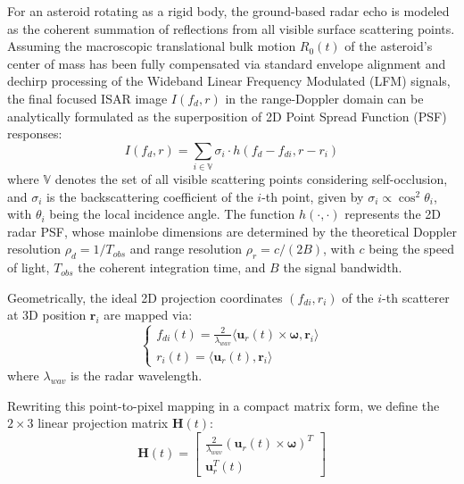 \documentclass[conference]{IEEEtran}
\begin{document}
For an asteroid rotating as a rigid body, the ground-based radar echo is modeled as the coherent summation of reflections from all visible surface scattering points. Assuming the macroscopic translational bulk motion $R_0(t)$ of the asteroid's center of mass has been fully compensated via standard envelope alignment and dechirp processing of the Wideband Linear Frequency Modulated (LFM) signals, the final focused ISAR image $I(f_d, r)$ in the range-Doppler domain can be analytically formulated as the superposition of 2D Point Spread Function (PSF) responses\cite{busch2010}\cite{brozovic2009}:
\begin{equation}
	I(f_d, r) = \sum_{i \in \mathbb{V}} \sigma_i \cdot h \left( f_d - f_{di}, r - r_i \right)
\end{equation}
where $\mathbb{V}$ denotes the set of all visible scattering points considering self-occlusion, and $\sigma_i$ is the backscattering coefficient of the $i$-th point, given by $\sigma_i \propto \cos^2\theta_i$, with $\theta_i$ being the local incidence angle\cite{zhou2023}. The function $h(\cdot, \cdot)$ represents the 2D radar PSF, whose mainlobe dimensions are determined by the theoretical Doppler resolution $\rho_d = 1 / T_{obs}$ and range resolution $\rho_r = c / (2B)$, with $c$ being the speed of light, $T_{obs}$ the coherent integration time, and $B$ the signal bandwidth.

Geometrically, the ideal 2D projection coordinates $(f_{di}, r_i)$ of the $i$-th scatterer at 3D position $\mathbf{r}_i$ are mapped via:
\begin{equation}
	\begin{cases}
		f_{di}(t) = \frac{2}{\lambda_{wav}} \langle \mathbf{u}_r(t) \times \boldsymbol{\omega}, \mathbf{r}_i \rangle \\
		r_i(t) = \langle \mathbf{u}_r(t), \mathbf{r}_i \rangle
	\end{cases}
	\label{fdi_ri}
\end{equation}
where $\lambda_{wav}$ is the radar wavelength.

Rewriting this point-to-pixel mapping in a compact matrix form, we define the $2 \times 3$ linear projection matrix $\mathbf{H}(t)$:
\begin{equation}
	\mathbf{H}(t) = 
	\begin{bmatrix}
		\frac{2}{\lambda_{wav}} \left( \mathbf{u}_r(t) \times \boldsymbol{\omega} \right)^T \\
		\mathbf{u}_r^T(t)
	\end{bmatrix}
\end{equation}
\end{document}
